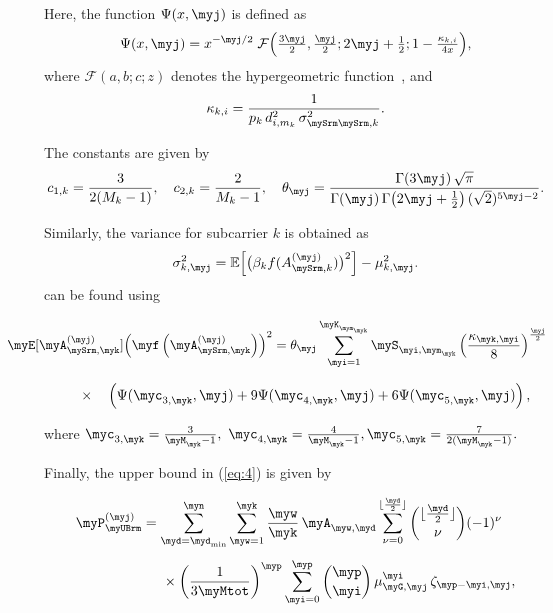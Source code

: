 \begin{minipage}[t][12cm]{\columnwidth}
Here, the function $\Psi(x,\myj)$ is defined as
\[
\Psi(x,\myj) = x^{-\myj/2} \;
\mathcal{F}\Bigl( \tfrac{3\myj}{2}, \tfrac{\myj}{2}; 2\myj + \tfrac{1}{2}; 1 - \tfrac{\kappa_{k,i}}{4x} \Bigr),
\]
where $\mathcal{F}(a,b;c;z)$ denotes the hypergeometric function~\cite{Gradshteyn2007_alt}, 
and 
\[
\kappa_{k,i} = \frac{1}{p_k \, d^2_{i,m_k} \, \sigma^2_{\mySrm\mySrm,k}}.
\]

The constants are given by
\[
c_{1,k} = \frac{3}{2(M_k-1)}, \quad
c_{2,k} = \frac{2}{M_k-1}, \quad
\theta_{\myj} = 
\frac{\Gamma(3\myj) \, \sqrt{\pi}}{\Gamma(\myj) \, \Gamma\bigl(2\myj + \tfrac{1}{2}\bigr) \, (\sqrt{2})^{5\myj-2}}.
\]

Similarly, the variance for subcarrier $k$ is obtained as
\[
\sigma^2_{k,\myj} = 
\mathbb{E}\Bigl[ \bigl( \beta_k f(A^{(\myj)}_{\mySrm,k}) \bigr)^2 \Bigr] - \mu^2_{k,\myj}.
\]
can be found using

\begin{equation*}
\hspace*{-1cm}
\myE[\myA^{(\myj)}_{\mySrm,\myk}]
{
   \left(\myf\left(\myA^{(\myj)}_{\mySrm,\myk}\right)\right)^2
}
= \theta_\myj \sum_{\myi=1}^{\myK_{\mym_\myk}}
\myS_{\myi,\mym_\myk}
\left(\frac{\kappa_{\myk,\myi}}{8}\right)^{\frac{\myj}{2}}
\end{equation*}

\begin{equation*}
\hspace*{0.5cm}
\times\quad \left(
   \Psi(\myc_{3,\myk}, \myj)
   + 9\Psi(\myc_{4,\myk}, \myj)
   + 6\Psi(\myc_{5,\myk}, \myj)
\right),
\end{equation*}

where
$
\myc_{3,\myk} = \frac{3}{\myM_\myk - 1},
\
\myc_{4,\myk} = \frac{4}{\myM_\myk - 1},
\myc_{5,\myk} = \frac{7}{2(\myM_\myk - 1)}.
$

Finally, the upper bound in (\ref{eq:4}) is given by

\begin{equation*}
\begin{aligned}
\myP^{(\myj)}_{\myUBrm}
&=
\sum_{\myd=\myd_{\min}}^{\myn}
\sum_{\myw=1}^{\myk}
\frac{\myw}{\myk}\, \myA_{\myw,\myd}
\sum_{\nu=0}^{\lfloor \frac{\myd}{2} \rfloor}
\binom{\lfloor \frac{\myd}{2} \rfloor}{\nu}
(-1)^{\nu}
\\[4pt]
&\hspace{0.5cm}\times
\left( \frac{1}{3\myMtot} \right)^{\myp}
\sum_{\myi=0}^{\myp}
\binom{\myp}{\myi}\,
\mu^{\myi}_{\myG,\myj}\,
\zeta_{\myp-\myi,\myj},
\end{aligned}
\end{equation*}

\end{minipage}

